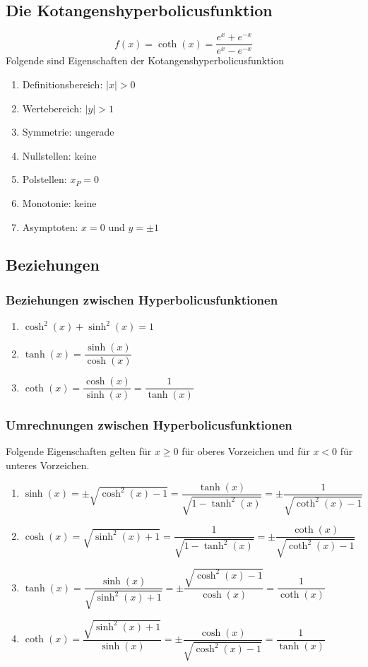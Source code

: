 \subsection{Die Kotangenshyperbolicusfunktion}
\begin{equation}
\boxed{f\left(x\right)=\coth\left(x\right)=\dfrac{e^x+e^{-x}}{e^x-e^{-x}}}
\end{equation}
Folgende sind Eigenschaften der Kotangenshyperbolicusfunktion
\begin{enumerate}[$(a)$]
\item Definitionsbereich: $\Big\vert x\Big\vert>0$
\item Wertebereich: $\Big\vert y\Big\vert>1$
\item Symmetrie: ungerade
\item Nullstellen: keine
\item Polstellen: $x_P=0$
\item Monotonie: keine
\item Asymptoten: $x=0$ und $y=\pm 1$ 
\end{enumerate}
\subsection{Beziehungen}
\subsubsection{Beziehungen zwischen Hyperbolicusfunktionen}
\begin{enumerate}[$(a)$]
\item $\cosh^2\left(x\right)+\sinh^2\left(x\right)=1$
\item $\tanh\left(x\right)=\dfrac{\sinh\left(x\right)}{\cosh\left(x\right)}$
\item $\coth\left(x\right)=\dfrac{\cosh\left(x\right)}{\sinh\left(x\right)}=\dfrac{1}{\tanh\left(x\right)}$
\end{enumerate}
\subsubsection{Umrechnungen zwischen Hyperbolicusfunktionen}
Folgende Eigenschaften gelten für $x\geq 0$ für oberes Vorzeichen und für $x<0$ für unteres Vorzeichen.
\begin{enumerate}[$(a)$]
\item $\sinh\left(x\right)=\pm\sqrt{\cosh^2\left(x\right)-1}=\dfrac{\tanh\left(x\right)}{\sqrt{1-\tanh^2\left(x\right)}}=\pm\dfrac{1}{\sqrt{\coth^2\left(x\right)-1}}$
\item $\cosh\left(x\right)=\sqrt{\sinh^2\left(x\right)+1}=\dfrac{1}{\sqrt{1-\tanh^2\left(x\right)}}=\pm\dfrac{\coth\left(x\right)}{\sqrt{\coth^2\left(x\right)-1}}$
\item $\tanh\left(x\right)=\dfrac{\sinh\left(x\right)}{\sqrt{\sinh^2\left(x\right)+1}}=\pm\dfrac{{\sqrt{\cosh^2\left(x\right)-1}}}{\cosh\left(x\right)}=\dfrac{1}{\coth\left(x\right)}$
\item $\coth\left(x\right)=\dfrac{\sqrt{\sinh^2\left(x\right)+1}}{\sinh\left(x\right)}=\pm\dfrac{\cosh\left(x\right)}{{\sqrt{\cosh^2\left(x\right)-1}}}=\dfrac{1}{\tanh\left(x\right)}$
\end{enumerate}
